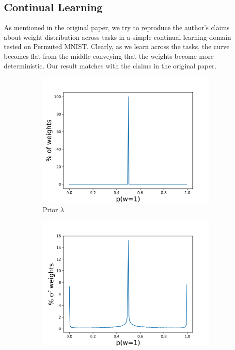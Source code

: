 \subsection{Continual Learning}
As mentioned in the original paper, we try to reproduce the author's claims about weight distribution across tasks in a simple continual learning domain tested on Permuted MNIST. Clearly, as we learn across the tasks, the curve becomes flat from the middle conveying that the weights become more deterministic. Our result matches with the claims in the original paper.
\begin{figure}[h]
     \centering
     \begin{subfigure}[b]{0.3\textwidth}
         \centering
         \includegraphics[width=1.1\textwidth]{../openreview/figs/after_task_0.png}
         \caption{Prior $\lambda$}
     \end{subfigure}
     \hfill
     \begin{subfigure}[b]{0.3\textwidth}
         \centering
         \includegraphics[width=1.1\textwidth]{../openreview/figs/after_task_1.png}

\end{subfigure}
\end{figure}
